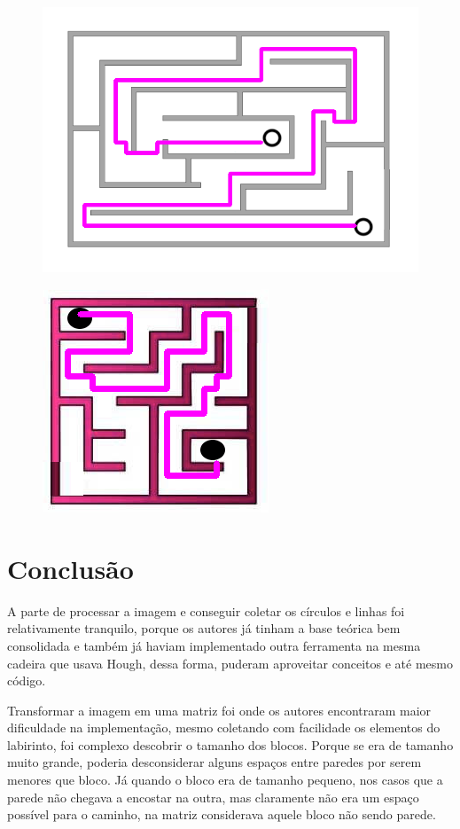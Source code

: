 \documentclass[conference]{IEEEtran}
\begin{document}
\begin{figure}[h!]
   \centering
    {\includegraphics[scale=0.3]{solutionlab2.png}}
\end{figure}
\begin{figure}[h!]
   \centering
    {\includegraphics[scale=0.5]{solutionlab3.png}}
\end{figure}

\section*{Conclusão}
A parte de processar a imagem e conseguir coletar os círculos e linhas foi relativamente tranquilo, porque os autores já tinham a base teórica bem consolidada e também já haviam implementado outra ferramenta na mesma cadeira que usava Hough, dessa forma, puderam aproveitar conceitos e até mesmo código.

Transformar a imagem em uma matriz foi onde os autores encontraram maior dificuldade na implementação, mesmo coletando com facilidade os elementos do labirinto, foi complexo descobrir o tamanho dos blocos. Porque se era de tamanho muito grande, poderia desconsiderar alguns espaços entre paredes por serem menores que bloco. Já quando o bloco era de tamanho pequeno, nos casos que a parede não chegava a encostar na outra, mas claramente não era um espaço possível para o caminho, na matriz considerava aquele bloco não sendo parede.
\end{document}
